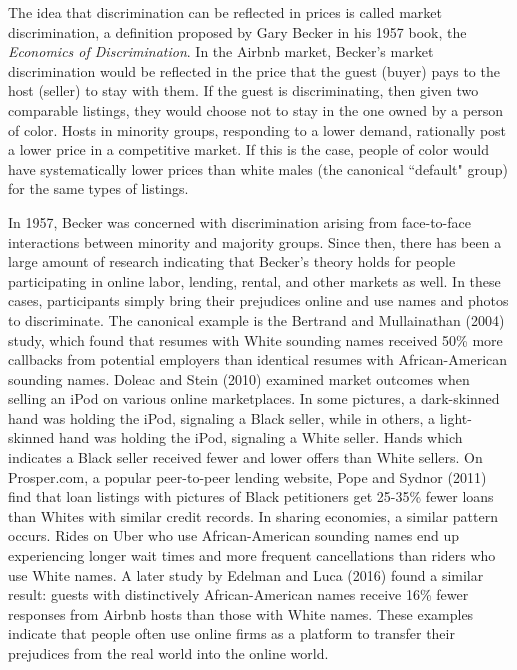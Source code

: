 \documentclass[11pt, oneside]{article}
\begin{document}
The idea that discrimination can be reflected in prices is called market discrimination, a definition proposed by Gary Becker in his 1957 book, the \textit{Economics of Discrimination}.\cite{becker} In the Airbnb market, Becker's market discrimination would be reflected in the price that the guest (buyer) pays to the host (seller) to stay with them. If the guest is discriminating, then given two comparable listings, they would choose not to stay in the one owned by a person of color. Hosts in minority groups, responding to a lower demand, rationally post a lower price in a competitive market. If this is the case, people of color would have systematically lower prices than white males (the canonical ``default" group) for the same types of listings. 

In 1957, Becker was concerned with discrimination arising from face-to-face interactions between minority and majority groups. Since then, there has been a large amount of research indicating that Becker's theory holds for people participating in online labor, lending, rental, and other markets as well. In these cases, participants simply bring their prejudices online and use names and photos to discriminate. The canonical example is the Bertrand and Mullainathan (2004) study, which found that resumes with White sounding names received 50\% more callbacks from potential employers than identical resumes with African-American sounding names.\cite{bertrand} Doleac and Stein (2010) examined market outcomes when selling an iPod on various online marketplaces. In some pictures, a dark-skinned hand was holding the iPod, signaling a Black seller, while in others, a light-skinned hand was holding the iPod, signaling a White seller.\cite{doleac} Hands which indicates a Black seller received fewer and lower offers than White sellers. On Prosper.com, a popular peer-to-peer lending website, Pope and Sydnor (2011) find that loan listings with pictures of Black petitioners get 25-35\% fewer loans than Whites with similar credit records.\cite{pope} In sharing economies, a similar pattern occurs. Rides on Uber who use African-American sounding names end up experiencing longer wait times and more frequent cancellations than riders who use White names.\cite{knittel} A later study by Edelman and Luca (2016) found a similar result: guests with distinctively African-American names receive 16\% fewer responses from Airbnb hosts than those with White names.\cite{edelman2} These examples indicate that people often use online firms as a platform to transfer their prejudices from the real world into the online world.   
\end{document}

